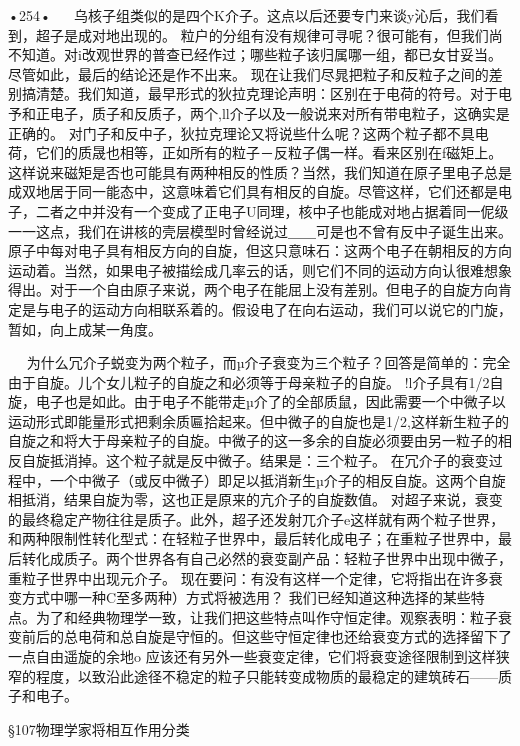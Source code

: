 •254•
  
乌核子组类似的是四个K介子。这点以后还要专门来谈y沁后，我们看到，超子是成对地出现的。
粒户的分组有没有规律可寻呢？很可能有，但我们尚不知道。对i改观世界的普查已经作过；哪些粒子该归属哪一组，都已女甘妥当。尽管如此，最后的结论还是作不出来。
现在让我们尽晁把粒子和反粒子之间的差别搞清楚。我们知道，最早形式的狄拉克理论声明：区别在于电荷的符号。对于电予和正电子，质子和反质子，两个,ll介子以及一般说来对所有带电粒子，这确实是正确的。
对门子和反中子，狄拉克理论又将说些什么呢？这两个粒子都不具电荷，它们的质晟也相等，正如所有的粒子－反粒子偶一样。看来区别在f磁矩上。
这样说来磁矩是否也可能具有两种相反的性质？当然，我们知道在原子里电子总是成双地居于同一能态中，这意味着它们具有相反的自旋。尽管这样，它们还都是电子，二者之中并没有一个变成了正电子U同理，核中子也能成对地占据着同一伲级一一这点，我们在讲核的壳层模型时曾经说过＿＿可是也不曾有反中子诞生出来。
原子中每对电子具有相反方向的自旋，但这只意味石：这两个电子在朝相反的方向运动着。当然，如果电子被描绘成几率云的话，则它们不同的运动方向认很难想象得出。对于一个自由原子来说，两个电子在能屈上没有差别。但电子的自旋方向肯定是与电子的运动方向相联系着的。假设电了在向右运动，我们可以说它的门旋，暂如，向上成某一角度。

  
为什么冗介子蜕变为两个粒子，而µ介子衰变为三个粒子？回答是简单的：完全由于自旋。儿个女儿粒子的自旋之和必须等于母亲粒子的自旋。
!l介子具有1/2自旋，电子也是如此。由于电子不能带走µ介了的全部质鼠，因此需要一个中微子以运动形式即能量形式把剩余质匾拾起来。但中微子的自旋也是1/2,这样新生粒子的自旋之和将大于母亲粒子的自旋。中微子的这一多余的自旋必须要由另一粒子的相反自旋抵消掉。这个粒子就是反中微子。结果是：三个粒子。
在冗介子的衰变过程中，一个中微子（或反中微子）即足以抵消新生µ介子的相反自旋。这两个自旋相抵消，结果自旋为零，这也正是原来的亢介子的自旋数值。
对超子来说，衰变的最终稳定产物往往是质子。此外，超子还发射兀介子e这样就有两个粒子世界，和两种限制性转化型式：在轻粒子世界中，最后转化成电子；在重粒子世界中，最后转化成质子。两个世界各有自己必然的衰变副产品：轻粒子世界中出现中微子，重粒子世界中出现元介子。
现在要问：有没有这样一个定律，它将指出在许多衰变方式中哪一种C至多两种）方式将被选用？
我们已经知道这种选择的某些特点。为了和经典物理学一致，让我们把这些特点叫作守恒定律。观察表明：粒子衰变前后的总电荷和总自旋是守恒的。但这些守恒定律也还给衰变方式的选择留下了一点自由遥旋的余地o
应该还有另外一些衰变定律，它们将衰变途径限制到这样狭窄的程度，以致沿此途径不稳定的粒子只能转变成物质的最稳定的建筑砖石——质子和电子。

§107物理学家将相互作用分类

